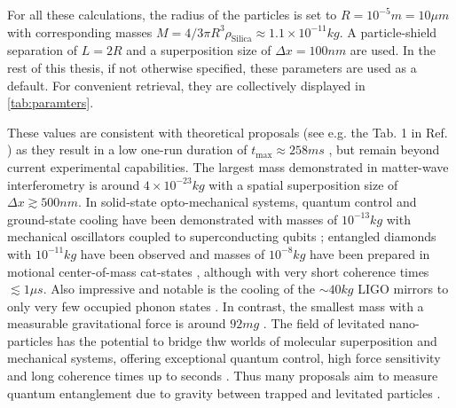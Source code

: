 For all these calculations, the radius of the particles is set to $R=10^{-5}\si{m} = 10\si{\mu m}$ with corresponding masses $M=4/3 \pi R^3 \rho_\mathrm{Silica} \approx 1.1\times 10^{-11}\si{kg}$.
A particle-shield separation of $L=2R$ and a superposition size of $\Delta x = 100\si{nm}$ are used.
In the rest of this thesis, if not otherwise specified, these parameters are used as a default.
For convenient retrieval, they are collectively displayed in \cref{tab:paramters}.

These values are consistent with theoretical proposals (see e.g. the Tab. 1 in Ref. \cite{Rijavec_2021}) as they result in a low one-run duration of $t_\mathrm{max}\approx 258\si{ms}$ \cite[Timestamp: 51:00]{Aspelmeyer_2024}, but remain beyond current experimental capabilities.
The largest mass demonstrated in matter-wave interferometry is around $4\times 10^{-23}\si{kg}$ \cite{Fein_2019} with a spatial superposition size of $\Delta x \gtrsim 500\si{nm}$.
In solid-state opto-mechanical systems, quantum control and ground-state cooling have been demonstrated with masses of $10^{-13}\si{kg}$ with mechanical oscillators coupled to superconducting qubits \cite{OConnell_2010}; entangled diamonds with $10^{-11}\si{kg}$ have been observed \cite{Lee_2011} and masses of $10^{-8}\si{kg}$ have been prepared in motional center-of-mass cat-states \cite{Bild_2023}, although with very short coherence times $\lesssim 1\si{\mu s}$.
Also impressive and notable is the cooling of the $\sim 40\si{kg}$ LIGO mirrors to only very few occupied phonon states \cite{Whittle_2021}.
In contrast, the smallest mass with a measurable gravitational force is around $92 \si{mg}$ \cite{Westphal_2021}.
The field of levitated nano-particles has the potential to bridge thw worlds of molecular superposition and mechanical systems, offering exceptional quantum control, high force sensitivity and long coherence times up to seconds \cite{Aspelmeyer_2024}.
Thus many proposals aim to measure quantum entanglement due to gravity between trapped and levitated particles \cite{Krisnanda_2020,GonzalezBallestero_2021}.

